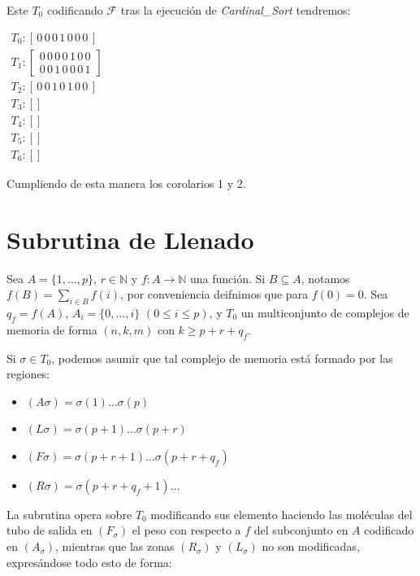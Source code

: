\documentclass[12pt, letterpaper, twoside]{article}
\begin{document}
    Este $T_0$ codificando $\mathcal{F}$ tras la ejecución de \emph{Cardinal\_Sort} tendremos: 

        $
        \begin{array}{l}
            T_0: [\,0\,0\,0\,1\,0\,0\,0\,] \\
            T_1: \left[\begin{array}{l} 0\,0\,0\,0\,1\,0\,0 \\ 0\,0\,1\,0\,0\,0\,1 \end{array} \right] \\
            T_2: [\,0\,0\,1\,0\,1\,0\,0\,] \\
            T_3: [] \\
            T_4: [] \\
            T_5: [] \\
            T_6: [] 
        \end{array}
        $ 


    Cumpliendo de esta manera los corolarios 1 y 2.

    \newpage
    \section{Subrutina de Llenado}
    Sea $A=\{1,\dots,p\}$, $r \in \mathbb{N}$ y $f:A\rightarrow\mathbb{N}$ una función. Si $B\subseteq A$, notamos $f(B)=\sum_{i\in B}f(i)$, por conveniencia deifnimos que para $f(0)=0$. Sea $q_f=f(A)$, $A_i=\{0,\dots,i\}$ $(0\leq i\leq p)$, y $T_0$ un multiconjunto de complejos de memoria de forma $(n,k,m)$ con $k\geq p+r+q_f$.


    Si $\sigma\in T_0$, podemos asumir que tal complejo de memoria está formado por las regiones:
    \begin{multicols}{2}
        \begin{itemize}
            \item $(A\sigma )=\sigma (1)\dots\sigma (p)$
            \item $(L\sigma )=\sigma (p+1)\dots\sigma (p+r)$
            \item $(F\sigma)=\sigma(p+r+1)\dots\sigma(p+r+q_f)$
            \item $(R\sigma)=\sigma(p+r+q_f+1)\dots$
        \end{itemize} 
    \end{multicols}


    La subrutina opera sobre $T_0$ modificando sus elemento haciendo las moléculas del tubo de salida en $(F_\sigma)$ el peso con respecto a $f$ del subconjunto en $A$ codificado en $(A_\sigma)$, mientras que las zonas $(R_\sigma)$ y $(L_\sigma)$ no son modificadas, expresándose todo esto de forma:
\end{document}
